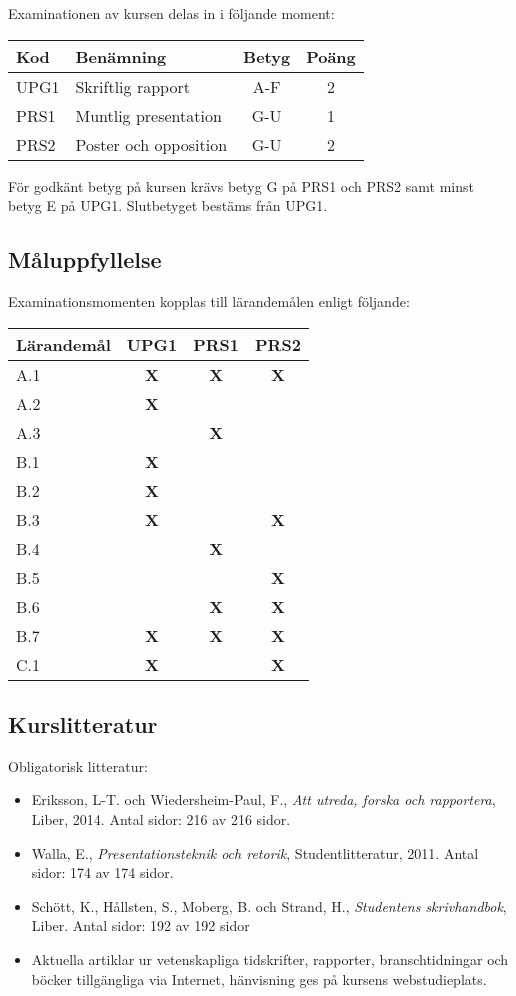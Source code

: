 Examinationen av kursen delas in i följande moment:

\begin{longtable}[]{@{}llcc@{}}
\toprule
\textsf{Kod} & \textsf{Benämning} & \textsf{Betyg} & \textsf{Poäng}\tabularnewline
\midrule
\endhead
UPG1 & Skriftlig rapport & A-F & 2\tabularnewline
PRS1 & Muntlig presentation & G-U & 1\tabularnewline
PRS2 & Poster och opposition & G-U & 2\tabularnewline
\bottomrule
\end{longtable}

För godkänt betyg på kursen krävs betyg G på PRS1 och PRS2 samt minst
betyg E på UPG1. Slutbetyget bestäms från UPG1.

\subsection*{Måluppfyllelse}

Examinationsmomenten kopplas till lärandemålen enligt följande:

\begin{longtable}[]{@{}lccc@{}}
\toprule
Lärandemål & UPG1 & PRS1 & PRS2\tabularnewline
\midrule
\endhead
A.1 & \textbf{X} & \textbf{X} & \textbf{X}\tabularnewline
A.2 & \textbf{X} & &\tabularnewline
A.3 & & \textbf{X} &\tabularnewline
B.1 & \textbf{X} & &\tabularnewline
B.2 & \textbf{X} & &\tabularnewline
B.3 & \textbf{X} & & \textbf{X}\tabularnewline
B.4 & & \textbf{X} &\tabularnewline
B.5 & & & \textbf{X}\tabularnewline
B.6 & & \textbf{X} & \textbf{X}\tabularnewline
B.7 & \textbf{X} & \textbf{X} & \textbf{X}\tabularnewline
C.1 & \textbf{X} & & \textbf{X}\tabularnewline
\bottomrule
\end{longtable}

\subsection*{Kurslitteratur}

Obligatorisk litteratur:

\begin{itemize}
\tightlist
\item
  Eriksson, L-T. och Wiedersheim-Paul, F., \emph{Att utreda, forska och
  rapportera}, Liber, 2014. Antal sidor: 216 av 216 sidor.
\item
  Walla, E., \emph{Presentationsteknik och retorik}, Studentlitteratur,
  2011. Antal sidor: 174 av 174 sidor.
\item
  Schött, K., Hållsten, S., Moberg, B. och Strand, H., \emph{Studentens
  skrivhandbok}, Liber. Antal sidor: 192 av 192 sidor
\item
  Aktuella artiklar ur vetenskapliga tidskrifter, rapporter,
  branschtidningar och böcker tillgängliga via Internet, hänvisning ges
  på kursens webstudieplats.
\end{itemize}

